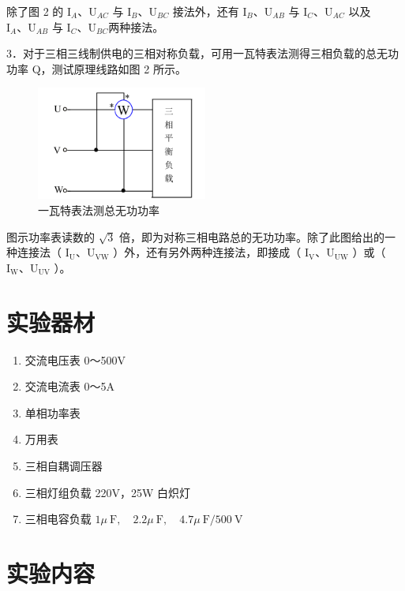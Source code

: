 \documentclass{article}
\begin{document}
除了图 2 的 $\mathrm{I}_A 、 \mathrm{U}_{A C}$ 与 $\mathrm{I}_B 、 \mathrm{U}_{B C}$ 接法外，还有 $\mathrm{I}_B 、 \mathrm{U}_{A B}$ 与 $\mathrm{I}_C 、 \mathrm{U}_{A C}$ 以及 $\mathrm{I}_A 、 \mathrm{U}_{A B}$ 与 $\mathrm{I}_C 、 \mathrm{U}_{B C}$两种接法。

3．对于三相三线制供电的三相对称负载，可用一瓦特表法测得三相负载的总无功功率 Q，测试原理线路如图 2 所示。

\begin{figure}[H]
    \centering
    \includegraphics[width=0.5\textwidth]{img2.png}
    \caption{一瓦特表法测总无功功率}
\end{figure}


图示功率表读数的 $\sqrt{3}$ 倍，即为对称三相电路总的无功功率。除了此图给出的一种连接法（ $\mathrm{I}_{\mathrm{U}} 、 \mathrm{U}_{\mathrm{VW}}$ ）外，还有另外两种连接法，即接成（ $\mathrm{I}_{\mathrm{V}} 、 \mathrm{U}_{\mathrm{UW}}$ ）或（ $\mathrm{I}_{\mathrm{W}} 、 \mathrm{U}_{\mathrm{UV}}$ ）。

\section{实验器材}
\label{sec:equipment}
    \begin{enumerate}
        \item 交流电压表  0～500V 
        \item 交流电流表 0～5A 
        \item 单相功率表 
        \item 万用表
        \item 三相自耦调压器 
        \item 三相灯组负载 220V，25W 白炽灯 
        \item 三相电容负载 $1 \mu \mathrm{~F}, \quad 2.2 \mu \mathrm{~F}, \quad 4.7 \mu \mathrm{~F} / 500 \mathrm{~V}$
    \end{enumerate} 

\section{实验内容}
\end{document}
